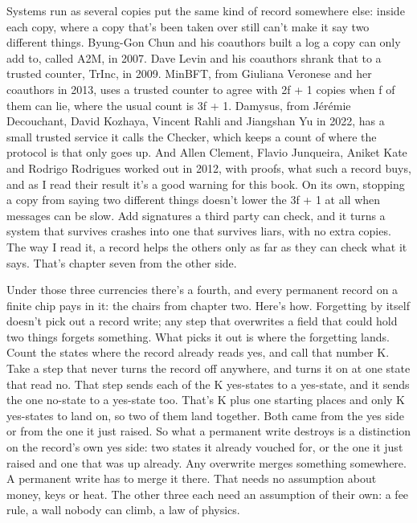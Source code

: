 \documentclass[11pt,twoside]{article}
\theoremstyle{thielethm}
\theoremstyle{thieledef}
\theoremstyle{thieledef}
\theoremstyle{thieledef}
\theoremstyle{thielethm}
\theoremstyle{thieleobs}
\theoremstyle{thielethm}
\begin{document}
Systems run as several copies put the same kind of record somewhere else: inside each copy, where a copy that's been taken over still can't make it say two different things. Byung-Gon Chun and his coauthors built a log a copy can only add to, called A2M, in 2007. Dave Levin and his coauthors shrank that to a trusted counter, TrInc, in 2009. MinBFT, from Giuliana Veronese and her coauthors in 2013, uses a trusted counter to agree with 2f + 1 copies when f of them can lie, where the usual count is 3f + 1. Damysus, from Jérémie Decouchant, David Kozhaya, Vincent Rahli and Jiangshan Yu in 2022, has a small trusted service it calls the Checker, which keeps a count of where the protocol is that only goes up. And Allen Clement, Flavio Junqueira, Aniket Kate and Rodrigo Rodrigues worked out in 2012, with proofs, what such a record buys, and as I read their result it's a good warning for this book. On its own, stopping a copy from saying two different things doesn't lower the 3f + 1 at all when messages can be slow. Add signatures a third party can check, and it turns a system that survives crashes into one that survives liars, with no extra copies. The way I read it, a record helps the others only as far as they can check what it says. That's chapter seven from the other side.

Under those three currencies there's a fourth, and every permanent record on a finite chip pays in it: the chairs from chapter two. Here's how. Forgetting by itself doesn't pick out a record write; any step that overwrites a field that could hold two things forgets something. What picks it out is where the forgetting lands. Count the states where the record already reads yes, and call that number K. Take a step that never turns the record off anywhere, and turns it on at one state that read no. That step sends each of the K yes-states to a yes-state, and it sends the one no-state to a yes-state too. That's K plus one starting places and only K yes-states to land on, so two of them land together. Both came from the yes side or from the one it just raised. So what a permanent write destroys is a distinction on the record's own yes side: two states it already vouched for, or the one it just raised and one that was up already. Any overwrite merges something somewhere. A permanent write has to merge it there. That needs no assumption about money, keys or heat. The other three each need an assumption of their own: a fee rule, a wall nobody can climb, a law of physics.
\end{document}
